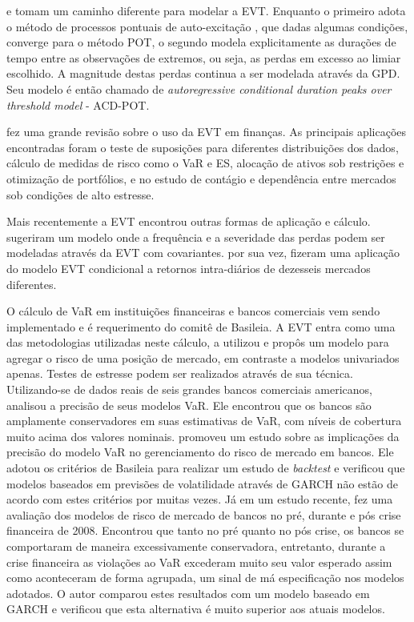 \documentclass[1p]{elsarticle}
\theoremstyle{definition}
\begin{document}
\cite{Chavez-Demoulin2005} e \cite{Herrera2013} tomam um caminho diferente para modelar a EVT. Enquanto o primeiro adota o método de processos pontuais de auto-excitação , que dadas algumas condições, converge para o método POT, o segundo modela explicitamente as durações de tempo entre as observações de extremos, ou seja, as perdas em excesso ao limiar escolhido. A magnitude destas perdas continua a ser modelada através da GPD. Seu modelo é então chamado de \emph{autoregressive conditional duration peaks over threshold model} - ACD-POT.

\cite{Rocco2014} fez uma grande revisão sobre o uso da EVT em finanças. As principais aplicações encontradas  foram o teste de suposições para diferentes distribuições dos dados, cálculo de medidas de risco como o VaR e ES, alocação de ativos sob restrições e otimização de portfólios, e no estudo de contágio e dependência entre mercados sob condições de alto estresse.

Mais recentemente a EVT encontrou outras formas de aplicação e cálculo. \cite{Chavez-Demoulin2016} sugeriram um modelo onde a frequência e a severidade das perdas podem ser modeladas através da EVT com covariantes.  \cite{Karmakar2016} por sua vez, fizeram uma aplicação do modelo EVT condicional a retornos intra-diários de dezesseis mercados diferentes.

O cálculo de VaR em instituições financeiras e bancos comerciais vem sendo implementado e é requerimento do comitê de Basileia. A EVT entra como uma das metodologias utilizadas neste cálculo,  \cite{Longin2000} a utilizou e propôs um modelo para agregar o risco de uma posição de mercado, em contraste a modelos univariados apenas. Testes de estresse podem ser realizados através de sua técnica. Utilizando-se de dados reais de seis grandes bancos comerciais americanos, \cite{Berkowitz2002} analisou a precisão de seus modelos VaR. Ele encontrou que os bancos são amplamente conservadores em suas estimativas de VaR, com níveis de cobertura muito acima dos valores nominais. \cite{Wong2003} promoveu um estudo sobre as implicações da precisão do modelo VaR no gerenciamento do risco de mercado em bancos. Ele adotou os critérios de Basileia para realizar um estudo de \emph{backtest} e verificou que modelos baseados em previsões de volatilidade através de GARCH não estão de acordo com estes critérios por muitas vezes. Já em um estudo recente, \cite{OBrien2017} fez uma avaliação dos modelos de risco de mercado de bancos no pré, durante e pós crise financeira de 2008. Encontrou que tanto no pré quanto no pós crise, os bancos se comportaram de maneira excessivamente conservadora, entretanto, durante a crise financeira as violações ao VaR excederam muito seu valor esperado assim como aconteceram de forma agrupada, um sinal de má especificação nos modelos adotados. O autor comparou estes resultados com um modelo baseado em GARCH e verificou que esta alternativa é muito superior aos atuais modelos.
\end{document}
